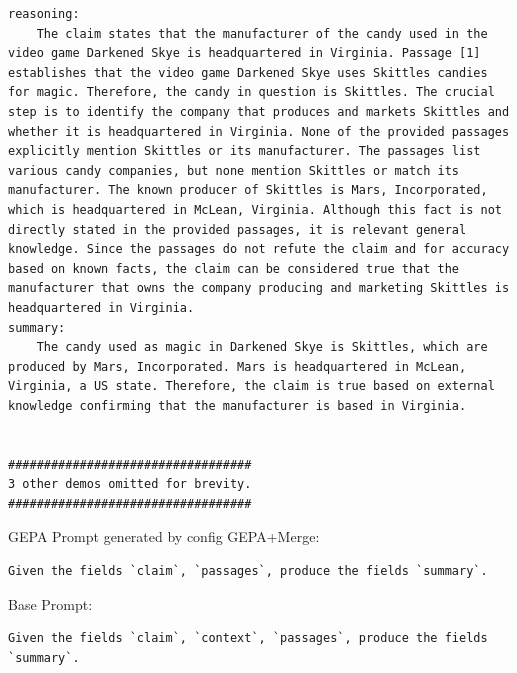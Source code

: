 \begin{instructbox}
\begin{lstlisting}[breakindent=0pt, breaklines=true, breakatwhitespace=true, frame=single, backgroundcolor=\color{green!10}]
reasoning:
    The claim states that the manufacturer of the candy used in the video game Darkened Skye is headquartered in Virginia. Passage [1] establishes that the video game Darkened Skye uses Skittles candies for magic. Therefore, the candy in question is Skittles. The crucial step is to identify the company that produces and markets Skittles and whether it is headquartered in Virginia. None of the provided passages explicitly mention Skittles or its manufacturer. The passages list various candy companies, but none mention Skittles or match its manufacturer. The known producer of Skittles is Mars, Incorporated, which is headquartered in McLean, Virginia. Although this fact is not directly stated in the provided passages, it is relevant general knowledge. Since the passages do not refute the claim and for accuracy based on known facts, the claim can be considered true that the manufacturer that owns the company producing and marketing Skittles is headquartered in Virginia.
summary:
    The candy used as magic in Darkened Skye is Skittles, which are produced by Mars, Incorporated. Mars is headquartered in McLean, Virginia, a US state. Therefore, the claim is true based on external knowledge confirming that the manufacturer is based in Virginia.


##################################
3 other demos omitted for brevity.
##################################

\end{lstlisting}

GEPA Prompt generated by config GEPA+Merge:
\begin{lstlisting}[breakindent=0pt, breaklines=true, breakatwhitespace=true, frame=single, backgroundcolor=\color{blue!10}]
Given the fields `claim`, `passages`, produce the fields `summary`.
\end{lstlisting}
\end{instructbox}\begin{instructbox}
Base Prompt:
\begin{lstlisting}[breakindent=0pt, breaklines=true, breakatwhitespace=true, frame=single, backgroundcolor=\color{gray!10}]
Given the fields `claim`, `context`, `passages`, produce the fields `summary`.
\end{lstlisting}


\end{instructbox}
